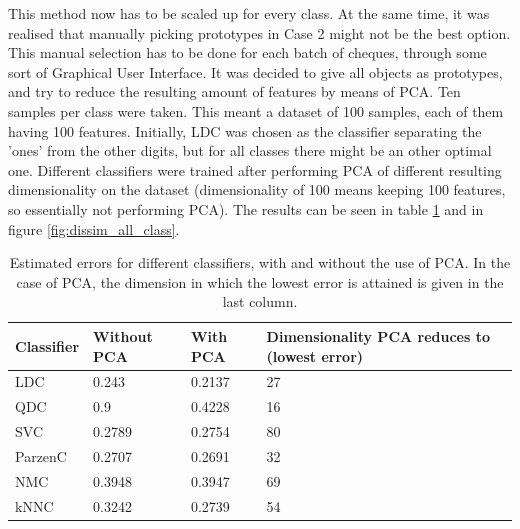 \noindent This method now has to be scaled up for every class. At the same time, it was realised that manually picking prototypes in Case 2 might not be the best option. This manual selection has to be done for each batch of cheques, through some sort of Graphical User Interface. It was decided to give all objects as prototypes, and try to reduce the resulting amount of features by means of PCA. Ten samples per class were taken. This meant a dataset of 100 samples, each of them having 100 features. Initially, LDC was chosen as the classifier separating the 'ones' from the other digits, but for all classes there might be an other optimal one. Different classifiers were trained after performing PCA of different resulting dimensionality on the dataset (dimensionality of 100 means keeping 100 features, so essentially not performing PCA). The results can be seen in table \ref{tab:dissim_all_class} and in figure \ref{fig:dissim_all_class}.
\begin{table}[H]
	\centering
	\caption{Estimated errors for different classifiers, with and without the use of PCA. In the case of PCA, the dimension in which the lowest error is attained is given in the last column.}
	\label{tab:dissim_all_class}
	\begin{tabular}{l|lll}
		Classifier & Without PCA & With PCA & Dimensionality PCA reduces to (lowest error) \\ \hline
		LDC        & 0.243       & 0.2137   & 27                                           \\
		QDC        & 0.9         & 0.4228   & 16                                           \\
		SVC        & 0.2789      & 0.2754   & 80                                           \\
		ParzenC    & 0.2707      & 0.2691   & 32                                           \\
		NMC        & 0.3948      & 0.3947   & 69                                           \\
		kNNC       & 0.3242      & 0.2739   & 54                                          
	\end{tabular}
\end{table}
